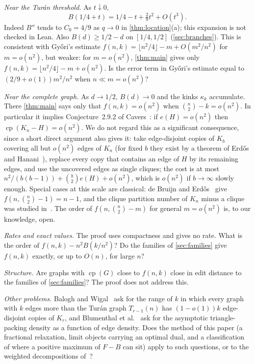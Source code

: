 \documentclass[10pt]{article}
\theoremstyle{definition}
\theoremstyle{remark}
\numberwithin{equation}{section}
\newcommand{\cp}{\operatorname{cp}}
\begin{document}
\emph{Near the Tur\'an threshold.} As $t\downarrow0$,
\[
 B(1/4+t)=1/4-t+\tfrac29t^2+O(t^3).
\]
Indeed $B''$ tends to $C_0=4/9$ as $q\to0$ in \cref{thm:location}(a); this expansion is not checked in Lean. Also $B(d)\ge1/2-d$ on $[1/4,1/2]$ (\cref{sec:branches}). This is consistent with Gy\H{o}ri's estimate $f(n,k)=\lfloor n^2/4\rfloor-m+O(m^2/n^2)$ for $m=o(n^2)$, but weaker: for $m=o(n^2)$, \cref{thm:main} gives only $f(n,k)=\lfloor n^2/4\rfloor-m+o(n^2)$. Is the error term in Gy\H{o}ri's estimate equal to $(2/9+o(1))m^2/n^2$ when $n\ll m=o(n^2)$?

\emph{Near the complete graph.} As $d\to1/2$, $B(d)\to0$ and the kinks $\kappa_k$ accumulate. There \cref{thm:main} says only that $f(n,k)=o(n^2)$ when $\binom n2-k=o(n^2)$. In particular it implies Conjecture~2.9.2 of Cavers~\cite{Cav05}: if $e(H)=o(n^2)$ then $\cp(K_n-H)=o(n^2)$. We do not regard this as a significant consequence, since a short direct argument also gives it: take edge-disjoint copies of $K_b$ covering all but $o(n^2)$ edges of $K_n$ (for fixed $b$ they exist by a theorem of Erd\H{o}s and Hanani~\cite{EH63}), replace every copy that contains an edge of $H$ by its remaining edges, and use the uncovered edges as single cliques; the cost is at most $n^2/(b(b-1))+\binom b2e(H)+o(n^2)$, which is $o(n^2)$ if $b\to\infty$ slowly enough. Special cases at this scale are classical: de Bruijn and Erd\H{o}s~\cite{dBE48} give $f(n,\binom n2-1)=n-1$, and the clique partition number of $K_n$ minus a clique was studied in~\cite{PD81,Wal82,EFO88}. The order of $f(n,\binom n2-m)$ for general $m=o(n^2)$ is, to our knowledge, open.

\emph{Rates and exact values.} The proof uses compactness and gives no rate. What is the order of $f(n,k)-n^2B(k/n^2)$? Do the families of \cref{sec:families} give $f(n,k)$ exactly, or up to $O(n)$, for large $n$?

\emph{Structure.} Are graphs with $\cp(G)$ close to $f(n,k)$ close in edit distance to the families of \cref{sec:families}? The proof does not address this.

\emph{Other problems.} Balogh and Wigal~\cite{BaWi25} ask for the range of $k$ in which every graph with $k$ edges more than the Tur\'an graph $T_{r-1}(n)$ has $(1-o(1))k$ edge-disjoint copies of $K_r$, and Blumenthal et al.~\cite{BLPPPV21} ask for the asymptotic triangle-packing density as a function of edge density. Does the method of this paper (a fractional relaxation, limit objects carrying an optimal dual, and a classification of where a positive maximum of $F-B$ can sit) apply to such questions, or to the weighted decompositions of~\cite{BHKNW26}?
\end{document}
